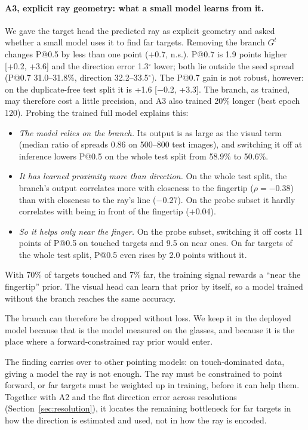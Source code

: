 \paragraph{A3, explicit ray geometry: what a small model learns from it.} We gave the target head the predicted ray as explicit geometry and asked whether a small model uses it to find far targets. Removing the branch $G^t$ changes P@0.5 by less than one point ($+$0.7, n.s.). P@0.7 is 1.9 points higher [+0.2, +3.6] and the direction error 1.3$^\circ$ lower; both lie outside the seed spread (P@0.7 31.0--31.8\%, direction 32.2--33.5$^\circ$). The P@0.7 gain is not robust, however: on the duplicate-free test split it is +1.6 [$-$0.2, +3.3]. The branch, as trained, may therefore cost a little precision, and A3 also trained 20\% longer (best epoch 120). Probing the trained full model explains this:
\begin{itemize}
\item \emph{The model relies on the branch.} Its output is as large as the visual term (median ratio of spreads 0.86 on 500--800 test images), and switching it off at inference lowers P@0.5 on the whole test split from 58.9\% to 50.6\%.
\item \emph{It has learned proximity more than direction.} On the whole test split, the branch's output correlates more with closeness to the fingertip ($\rho=-0.38$) than with closeness to the ray's line ($-0.27$). On the probe subset it hardly correlates with being in front of the fingertip ($+0.04$).
\item \emph{So it helps only near the finger.} On the probe subset, switching it off costs 11 points of P@0.5 on touched targets and 9.5 on near ones. On far targets of the whole test split, P@0.5 even rises by 2.0 points without it.
\end{itemize}
With 70\% of targets touched and 7\% far, the training signal rewards a ``near the fingertip'' prior. The visual head can learn that prior by itself, so a model trained without the branch reaches the same accuracy.

The branch can therefore be dropped without loss. We keep it in the deployed model because that is the model measured on the glasses, and because it is the place where a forward-constrained ray prior would enter.

The finding carries over to other pointing models: on touch-dominated data, giving a model the ray is not enough. The ray must be constrained to point forward, or far targets must be weighted up in training, before it can help them. Together with A2 and the flat direction error across resolutions (Section~\ref{sec:resolution}), it locates the remaining bottleneck for far targets in how the direction is estimated and used, not in how the ray is encoded.

